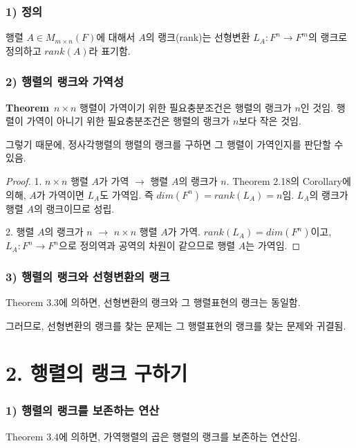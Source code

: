 \subsubsection*{1) 정의\\}
\begin{DEF}
행렬 $A \in M_{m \times n}(F)$에 대해서 $A$의 랭크(rank)는 선형변환 $L_A:F^n \rightarrow F^m$의 랭크로 정의하고 $rank(A)$라 표기함.
\end{DEF}

\subsubsection*{2) 행렬의 랭크와 가역성}
\textbf{Theorem}\, $n \times n$ 행렬이 가역이기 위한 필요충분조건은 행렬의 랭크가 $n$인 것임. 행렬이 가역이 아니기 위한 필요충분조건은 행렬의 랭크가 $n$보다 작은 것임.

그렇기 때문에, 정사각행렬의 행렬의 랭크를 구하면 그 행렬이 가역인지를 판단할 수 있음.

\begin{proof}
1. $n \times n$ 행렬 $A$가 가역 $\rightarrow$ 행렬 $A$의 랭크가 $n$.
Theorem 2.18의 Corollary에 의해, $A$가 가역이면 $L_A$도 가역임. 즉 $dim(F^n)=rank(L_A)=n$임. $L_A$의 랭크가 행렬 $A$의 랭크이므로 성립.

2. 행렬 $A$의 랭크가 $n$ $\rightarrow$ $n \times n$ 행렬 $A$가 가역.
$rank(L_A)=dim(F^n)$이고, $L_A:F^n \rightarrow F^n$으로 정의역과 공역의 차원이 같으므로 행렬 $A$는 가역임.
\end{proof}

\subsubsection*{3) 행렬의 랭크와 선형변환의 랭크}
Theorem 3.3에 의하면, 선형변환의 랭크와 그 행렬표현의 랭크는 동일함.

그러므로, 선형변환의 랭크를 찾는 문제는 그 행렬표현의 랭크를 찾는 문제와 귀결됨.\\


\section*{2. 행렬의 랭크 구하기}
\subsubsection*{1) 행렬의 랭크를 보존하는 연산}
Theorem 3.4에 의하면, 가역행렬의 곱은 행렬의 랭크를 보존하는 연산임.

